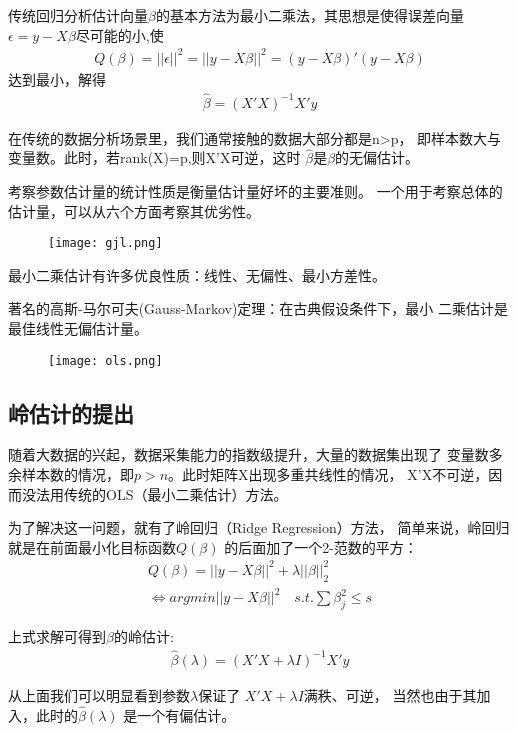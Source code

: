 \documentclass[12pt]{article}
\begin{document}
传统回归分析估计向量$\beta$的基本方法为最小二乘法，其思想是使得误差向量
$\epsilon=y-X\beta$尽可能的小,使
\begin{align}
	Q(\beta)=||\epsilon||^2=||y-X\beta||^2=(y-X\beta)'(y-X\beta)
\end{align}
达到最小，解得
\begin{align}
	\hat{\beta}=(X'X)^{-1}X'y
\end{align}

在传统的数据分析场景里，我们通常接触的数据大部分都是n>p，
即样本数大与变量数。此时，若rank(X)=p,则X'X可逆，这时
$\hat{\beta}$是$\beta$的无偏估计。


考察参数估计量的统计性质是衡量估计量好坏的主要准则。
一个用于考察总体的估计量，可以从六个方面考察其优劣性。
\begin{figure}[htbp]
	\centering
	\texttt{[image: gjl.png]}
\end{figure}

最小二乘估计有许多优良性质：线性、无偏性、最小方差性。

著名的高斯-马尔可夫(Gauss-Markov)定理：在古典假设条件下，最小
二乘估计是最佳线性无偏估计量。

\begin{figure}[htbp]
	\centering
	\texttt{[image: ols.png]}
\end{figure}

\subsection{岭估计的提出}

随着大数据的兴起，数据采集能力的指数级提升，大量的数据集出现了
变量数多余样本数的情况，即$p>n$。此时矩阵X出现多重共线性的情况，
X'X不可逆，因而没法用传统的OLS（最小二乘估计）方法。

为了解决这一问题，就有了岭回归（Ridge Regression）方法，
简单来说，岭回归就是在前面最小化目标函数$Q(\beta)$ 
的后面加了一个2-范数的平方：
\begin{gather}
	Q(\beta)=||y-X\beta||^2+\lambda||\beta||_2^2\\
	\Leftrightarrow argmin||y-X\beta||^2 \quad s.t. \sum \beta_j^2\leq s
\end{gather}

上式求解可得到$\beta$的岭估计:
\begin{align}
	\hat{\beta}(\lambda)=(X'X+\lambda I)^{-1}X'y
\end{align}

从上面我们可以明显看到参数$\lambda$保证了
$X'X+\lambda I$满秩、可逆，
当然也由于其加入，此时的$\hat{\beta}(\lambda)$
是一个有偏估计。
\end{document}
